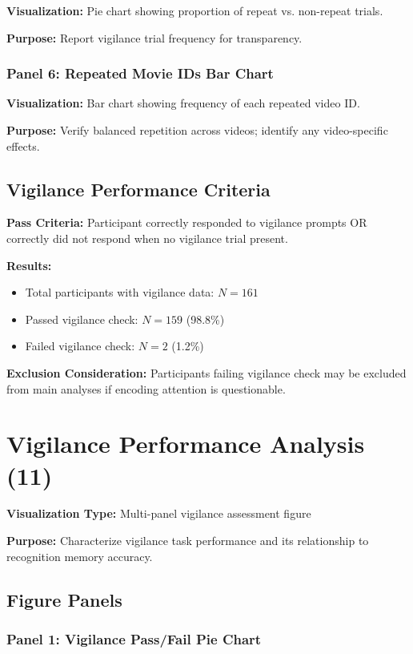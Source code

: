 \documentclass[12pt,a4paper]{article}
\begin{document}
\textbf{Visualization:} Pie chart showing proportion of repeat vs. non-repeat trials.

\textbf{Purpose:} Report vigilance trial frequency for transparency.

\subsubsection{Panel 6: Repeated Movie IDs Bar Chart}

\textbf{Visualization:} Bar chart showing frequency of each repeated video ID.

\textbf{Purpose:} Verify balanced repetition across videos; identify any video-specific effects.

\subsection{Vigilance Performance Criteria}

\textbf{Pass Criteria:} Participant correctly responded to vigilance prompts OR correctly did not respond when no vigilance trial present.

\textbf{Results:}
\begin{itemize}
    \item Total participants with vigilance data: $N=161$
    \item Passed vigilance check: $N=159$ (98.8\%)
    \item Failed vigilance check: $N=2$ (1.2\%)
\end{itemize}

\textbf{Exclusion Consideration:} Participants failing vigilance check may be excluded from main analyses if encoding attention is questionable.

\newpage
\section{Vigilance Performance Analysis (11)}

\textbf{Visualization Type:} Multi-panel vigilance assessment figure

\textbf{Purpose:} Characterize vigilance task performance and its relationship to recognition memory accuracy.

\subsection{Figure Panels}

\subsubsection{Panel 1: Vigilance Pass/Fail Pie Chart}
\end{document}
